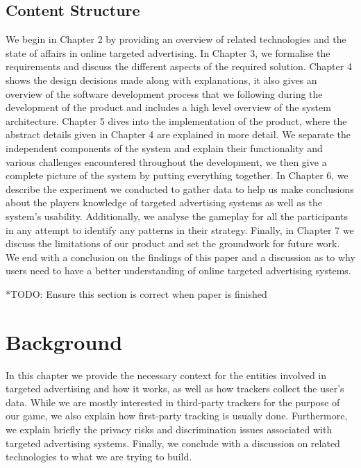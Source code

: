 \documentclass{l4proj}
\begin{document}
\section{Content Structure}
We begin in Chapter 2 by providing an overview of related technologies and the state of affairs in online targeted advertising. In Chapter 3, we formalise the requirements and discuss the different aspects of the required solution. Chapter 4 shows the design decisions made along with explanations, it also gives an overview of the software development process that we following during the development of the product and includes a high level overview of the system architecture. Chapter 5 dives into the implementation of the product, where the abstract details given in Chapter 4 are explained in more detail. We separate the independent components of the system and explain their functionality and various challenges encountered throughout the development, we then give a complete picture of the system by putting everything together. In Chapter 6, we describe the experiment we conducted to gather data to help us make conclusions about the players knowledge of targeted advertising systems as well as the system's usability. Additionally, we analyse the gameplay for all the participants in any attempt to identify any patterns in their strategy. Finally, in Chapter 7 we discuss the limitations of our product and set the groundwork for future work. We end with a conclusion on the findings of this paper and a discussion as to why users need to have a better understanding of online targeted advertising systems.

*TODO: Ensure this section is correct when paper is finished

\chapter{Background}
In this chapter we provide the necessary context for the entities involved in targeted advertising and how it works, as well as how trackers collect the user's data. While we are mostly interested in third-party trackers for the purpose of our game, we also explain how first-party tracking is usually done. Furthermore, we explain briefly the privacy risks and discrimination issues associated with targeted advertising systems. Finally, we conclude with a discussion on related technologies to what we are trying to build.
\end{document}
